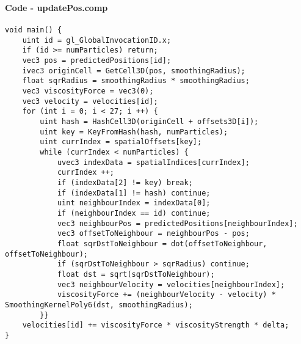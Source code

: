 \begin{frame}[fragile]
    \frametitle{\anxpti}
    \framesubtitle{Code - updatePos.comp}

    \begin{verbatim}
void main() {
    uint id = gl_GlobalInvocationID.x;
    if (id >= numParticles) return;
    vec3 pos = predictedPositions[id];
    ivec3 originCell = GetCell3D(pos, smoothingRadius);
    float sqrRadius = smoothingRadius * smoothingRadius;
    vec3 viscosityForce = vec3(0);
    vec3 velocity = velocities[id];
    for (int i = 0; i < 27; i ++) {
        uint hash = HashCell3D(originCell + offsets3D[i]);
        uint key = KeyFromHash(hash, numParticles);
        uint currIndex = spatialOffsets[key];
        while (currIndex < numParticles) {
            uvec3 indexData = spatialIndices[currIndex];
            currIndex ++;
            if (indexData[2] != key) break;
            if (indexData[1] != hash) continue;
            uint neighbourIndex = indexData[0];
            if (neighbourIndex == id) continue;
            vec3 neighbourPos = predictedPositions[neighbourIndex];
            vec3 offsetToNeighbour = neighbourPos - pos;
            float sqrDstToNeighbour = dot(offsetToNeighbour, offsetToNeighbour);
            if (sqrDstToNeighbour > sqrRadius) continue;
            float dst = sqrt(sqrDstToNeighbour);
            vec3 neighbourVelocity = velocities[neighbourIndex];
            viscosityForce += (neighbourVelocity - velocity) * SmoothingKernelPoly6(dst, smoothingRadius);
        }}
    velocities[id] += viscosityForce * viscosityStrength * delta;
}
    \end{verbatim}
\end{frame}
